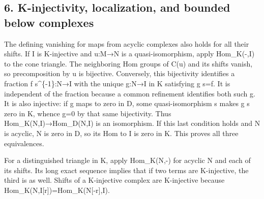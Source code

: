 \documentclass[11pt]{article}
\begin{document}
\subsection{\texorpdfstring{6. K-injectivity,\allowbreak{} localization,\allowbreak{} and bounded below complexes}{6.   and bounded below complexes}}\label{proofs-9206-9744-k-injectivity-localization-and-bounded-below-complexes}

The defining vanishing for maps from acyclic complexes also holds for all their shifts. If I is K-injective and u:\allowbreak{}M\allowbreak{}→N is a quasi-isomorphism,\allowbreak{} apply Hom\_\allowbreak{}K(-,\allowbreak{}I)\allowbreak{} to the cone triangle. The neighboring Hom groups of C(u)\allowbreak{} and its shifts vanish,\allowbreak{} so precomposition by u is bijective. Conversely,\allowbreak{} this bijectivity identifies a fraction f s\textasciicircum{}\{-1\}:\allowbreak{}N\allowbreak{}→I with the unique g:\allowbreak{}N\allowbreak{}→I in K satisfying g s\allowbreak{}=f. It is independent of the fraction because a common refinement identifies both such g. It is also injective:\allowbreak{} if g maps to zero in D,\allowbreak{} some quasi-isomorphism s makes g s zero in K,\allowbreak{} whence g\allowbreak{}=0 by that same bijectivity. Thus Hom\_\allowbreak{}K(N,\allowbreak{}I)\allowbreak{}\allowbreak{}→Hom\_\allowbreak{}D(N,\allowbreak{}I)\allowbreak{} is an isomorphism. If this last condition holds and N is acyclic,\allowbreak{} N is zero in D,\allowbreak{} so its Hom to I is zero in K. This proves all three equivalences.

For a distinguished triangle in K,\allowbreak{} apply Hom\_\allowbreak{}K(N,\allowbreak{}-)\allowbreak{} for acyclic N and each of its shifts. Its long exact sequence implies that if two terms are K-injective,\allowbreak{} the third is as well. Shifts of a K-injective complex are K-injective because Hom\_\allowbreak{}K(N,\allowbreak{}I[r]\allowbreak{})\allowbreak{}\allowbreak{}=Hom\_\allowbreak{}K(N[-r]\allowbreak{},\allowbreak{}I)\allowbreak{}.
\end{document}
